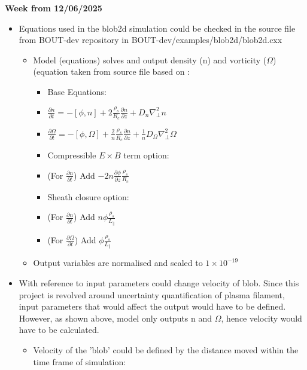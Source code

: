 \documentclass{article}
\begin{document}
\begin{arrowlist}
    \item \textbf{Week from 12/06/2025}
        \begin{itemize}
            \item Equations used in the blob2d simulation could be checked in the source file from BOUT-dev repository in BOUT-dev/examples/blob2d/blob2d.cxx
            \begin{itemize}
                \item Model (equations) solves and output density (n) and vorticity ($\Omega$) (equation taken from source file based on \cite{dudson_bout_2009}:
                \begin{itemize}
                    \item Base Equations:
                    \item[] $\frac{\partial n}{\partial t}=-\left[\phi,n\right]+2\frac{\rho_s}{R_c}\frac{\partial n}{\partial z}+D_n{\nabla^2_{\perp}}n$
                    \item[] $\frac{\partial \Omega}{\partial t}=-\left[\phi,\Omega\right]+\frac{2}{n}\frac{\rho_s}{R_c}\frac{\partial n}{\partial z}+\frac{1}{n}D_{\Omega}{\nabla^2_{\perp}}{\Omega}$
                    \item Compressible $E\times B$ term option:
                    \item [] (For $\frac{\partial n}{\partial t}$) Add $-2n\frac{\partial \phi}{\partial z}\frac{\rho_s}{R_c}$
                    \item Sheath closure option:
                    \item [] (For $\frac{\partial n}{\partial t}$) Add $n\phi\frac{\rho_s}{L_{\parallel}}$
                    \item [] (For $\frac{\partial \Omega}{\partial t}$) Add $\phi\frac{\rho_s}{L_{\parallel}}$
                \end{itemize}
                \item Output variables are normalised and scaled to $1\times 10^{-19}$
            \end{itemize}
            \item With reference to \cite{omotani_effects_2015} input parameters could change velocity of blob. Since this project is revolved around uncertainty quantification of plasma filament, input parameters that would affect the output would have to be defined. However, as shown above, model only outputs n and $\Omega$, hence velocity would have to be calculated.
            \begin{itemize}
                \item Velocity of the 'blob' could be defined by the distance moved within the time frame of simulation: 

\end{itemize}
\end{itemize}
\end{arrowlist}
\end{document}
